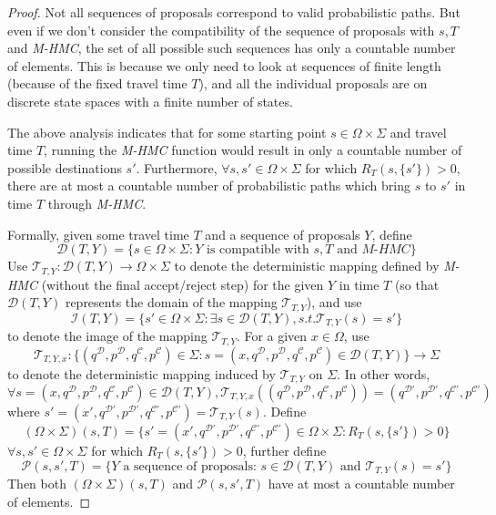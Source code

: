 \documentclass{article}
\newcommand{\cald}{\mathcal{D}}
\newcommand{\calc}{\mathcal{C}}
\begin{document}
\begin{proof}
Not all sequences of proposals correspond to valid probabilistic paths. But even if we don't consider the compatibility of the sequence of proposals with $s, T$ and \textit{M-HMC}, the set of all possible such sequences has only a countable number of elements. This is because we only need to look at sequences of finite length (because of the fixed travel time $T$), and all the individual proposals are on discrete state spaces with a finite number of states.

The above analysis indicates that for some starting point $s\in\Omega\times\Sigma$ and travel time $T$, running the \textit{M-HMC} function would result in only a countable number of possible destinations $s'$. Furthermore, $\forall s, s'\in\Omega\times\Sigma$ for which $R_T(s, \{ s' \}) > 0$, there are at most a countable number of probabilistic paths which bring $s$ to $s'$ in time $T$ through \textit{M-HMC}.

Formally, given some travel time $T$ and a sequence of proposals $Y$, define
\begin{equation*}
	\mathcal{D}(T, Y) = \{s\in \Omega\times\Sigma: Y\text{ is compatible with }s, T\text{ and }\textit{M-HMC}\}
\end{equation*}
Use $\mathcal{T}_{T, Y} : \mathcal{D}(T, Y)\rightarrow \Omega\times\Sigma$ to denote the deterministic mapping defined by \textit{M-HMC} (without the final accept/reject step) for the given $Y$ in time $T$ (so that $\mathcal{D}(T, Y)$ represents the domain of the mapping $\mathcal{T}_{T, Y}$), and use
\begin{equation*}
	\mathcal{I}(T, Y) = \{s'\in\Omega\times\Sigma: \exists s\in \mathcal{D}(T, Y), s.t. \mathcal{T}_{T, Y}(s) = s'\}
\end{equation*}
to denote the image of the mapping $\mathcal{T}_{T, Y}$. For a given $x\in\Omega$, use
$$\mathcal{T}_{T, Y, x}: \{(q^\cald, p^\cald, q^\calc, p^\calc)\in\Sigma: s=(x, q^\cald, p^\cald, q^\calc, p^\calc)\in\mathcal{D}(T, Y)\} \rightarrow \Sigma$$
to denote the deterministic mapping induced by $\mathcal{T}_{T, Y}$ on $\Sigma$. In other words, $$\forall s=(x, q^\cald, p^\cald, q^\calc, p^\calc)\in\mathcal{D}(T, Y), \mathcal{T}_{T, Y, x}((q^\cald, p^\cald, q^\calc, p^\calc)) = (q^{\cald\prime}, p^{\cald\prime}, q^{\calc\prime}, p^{\calc\prime})$$ where $s'=(x', q^{\cald\prime}, p^{\cald\prime}, q^{\calc\prime}, p^{\calc\prime})=\mathcal{T}_{T, Y}(s)$.
Define
\begin{equation*}
    (\Omega\times\Sigma)(s, T) = \{ s' = (x', q^{\cald\prime}, p^{\cald\prime}, q^{\calc\prime}, p^{\calc\prime}) \in \Omega\times\Sigma : R_T (s, \{ s' \}) > 0 \}
\end{equation*}
$\forall s, s'\in\Omega\times\Sigma$ for which $R_T(s, \{ s' \}) > 0$, further define
\begin{equation*}
	\mathcal{P}(s, s', T) = \{Y\text{ a sequence of proposals: } s\in\mathcal{D}(T, Y)\text{ and }\mathcal{T}_{T, Y}(s) = s'\}
\end{equation*}
Then both $(\Omega\times\Sigma)(s, T)$ and $\mathcal{P}(s, s', T)$ have at most a countable number of elements.


\end{proof}
\end{document}
